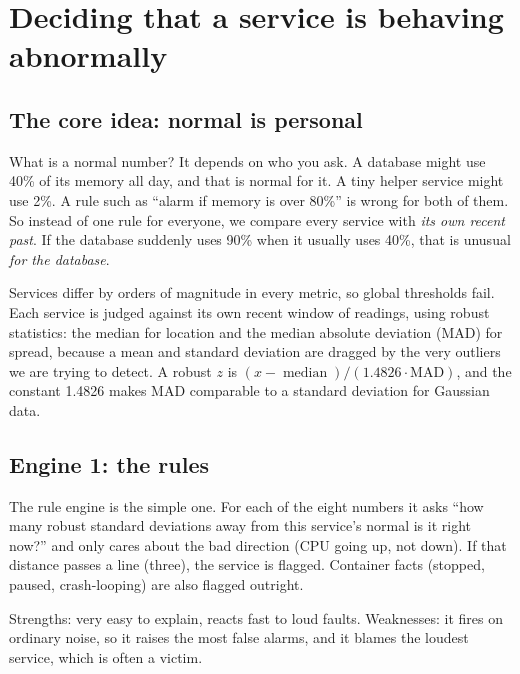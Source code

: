 \chapter{Deciding that a service is behaving abnormally}
\label{ch:detect}

\section{The core idea: normal is personal}
\begin{simplebox}
What is a normal number? It depends on who you ask. A database might use 40\% of its memory all day, and that is normal for it. A tiny helper service might use 2\%. A rule such as ``alarm if memory is over 80\%'' is wrong for both of them. So instead of one rule for everyone, we compare every service with \emph{its own recent past}. If the database suddenly uses 90\% when it usually uses 40\%, that is unusual \emph{for the database}.
\end{simplebox}

\begin{techbox}
Services differ by orders of magnitude in every metric, so global thresholds fail. Each service is judged against its own recent window of readings, using robust statistics: the median for location and the median absolute deviation (MAD) for spread, because a mean and standard deviation are dragged by the very outliers we are trying to detect. A robust $z$ is $(x-\operatorname{median})/(1.4826\cdot\mathrm{MAD})$, and the constant 1.4826 makes MAD comparable to a standard deviation for Gaussian data.
\end{techbox}

\section{Engine 1: the rules}
\begin{simplebox}
The rule engine is the simple one. For each of the eight numbers it asks ``how many robust standard deviations away from this service's normal is it right now?'' and only cares about the bad direction (CPU going up, not down). If that distance passes a line (three), the service is flagged. Container facts (stopped, paused, crash-looping) are also flagged outright.

Strengths: very easy to explain, reacts fast to loud faults. Weaknesses: it fires on ordinary noise, so it raises the most false alarms, and it blames the loudest service, which is often a victim.
\end{simplebox}

